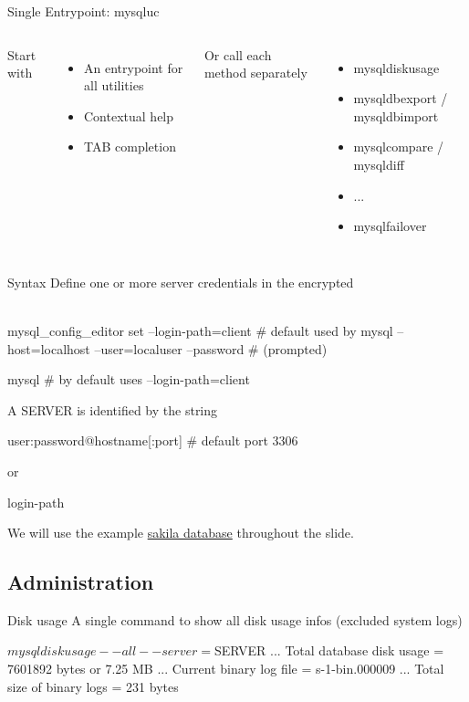 \documentclass{beamer}[10]
\begin{document}
\begin{pyframe}{Single Entrypoint: mysqluc}
\begin{columns}
    Start with 
    \begin{itemize}
    \item An entrypoint for all utilities
    \item Contextual help
    \item TAB completion
    \end{itemize}

    Or call each method separately
    \begin{itemize}
    \item mysqldiskusage
    \item mysqldbexport / mysqldbimport
    \item mysqlcompare / mysqldiff
    \item ...
    \item mysqlfailover
    \end{itemize}
\end{columns}
\end{pyframe}


\begin{pyframe}{Syntax}
Define one or more server credentials in the encrypted \\ \\
\begin{bashcode}
    mysql_config_editor set
        --login-path=client # default used by mysql
        --host=localhost --user=localuser
        --password # (prompted)

    mysql # by default uses --login-path=client
\end{bashcode}

A SERVER is identified by the string
\begin{bashcode}
    user:password@hostname[:port] # default port 3306
\end{bashcode}
or
\begin{bashcode}
    login-path
\end{bashcode}
We will use the example \href{http://dev.mysql.com/doc/index-other.html}
{sakila database} throughout the slide.

\end{pyframe}


\subsection{Administration}
\begin{pyframe}{Disk usage}
A single command to show all disk usage infos (excluded system logs)

\begin{bashcode}
$ mysqldiskusage --all --server=$SERVER
...
Total database disk usage = 7601892 bytes or 7.25 MB
...
Current binary log file = s-1-bin.000009
...
Total size of binary logs = 231 bytes
\end{bashcode}
\end{pyframe}
\end{document}
